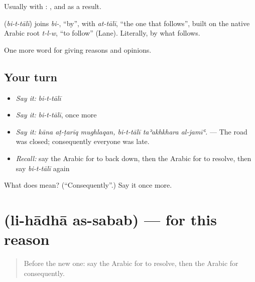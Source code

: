 Usually with : , and as a result.

\begin{cousinweb}
\textbf{} (\emph{bi-t-tālī}) joins \emph{bi-}, \textquotedblleft{}by\textquotedblright{}, with \emph{at-tālī}, \textquotedblleft{}the one that follows\textquotedblright{}, built on the native Arabic root \emph{t-l-w}, \textquotedblleft{}to follow\textquotedblright{} (Lane). Literally, by what follows.
\end{cousinweb}

\begin{grammarlens}[title={What you've built}]
One more word for giving reasons and opinions.
\end{grammarlens}

\subsection*{Your turn}
\begin{itemize}
\raggedright
  \item \emph{Say it:} \emph{bi-t-tālī}
  \item \emph{Say it:} \emph{bi-t-tālī}, once more
  \item \emph{Say it:} \emph{kāna aṭ-ṭarīq mughlaqan, bi-t-tālī taʾakhkhara al-jamīʿ.} — The road was closed; consequently everyone was late.
  \item \emph{Recall:} say the Arabic for to back down, then the Arabic for to resolve, then say \emph{bi-t-tālī} again
\end{itemize}

\begin{tcolorbox}[breakable,colback=teal!4,colframe=teal!35!black,title={Before you move on}]
What does  mean? (\textquotedblleft{}Consequently\textquotedblright{}.) Say it once more.
\end{tcolorbox}
\section[\texorpdfstring{\ar{لهذا} \ar{السبب} (li-hādhā as-sabab)}{لهذا السبب (li-hādhā as-sabab)}]{  (li-hādhā as-sabab) — for this reason}

\label{lesson:AR-C374-li-hadha-as-sabab}



\begin{quote}
Before the new one: say the Arabic for to resolve, then the Arabic for consequently.
\end{quote}

